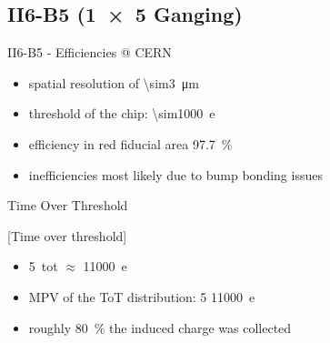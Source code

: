 \subsection{II6-B5 (\SI{1x5}{} Ganging)}
\begin{frame}{II6-B5 - Efficiencies @ CERN}

	
	\begin{itemize}\itemfill
		\item spatial resolution of \SI{\sim3}{\micro\meter}
		\item threshold of the chip: \SI{\sim1000}{e}
		\item efficiency in red fiducial area \SI{97.7}{\%}
		\item inefficiencies most likely due to bump bonding issues
	\end{itemize}
	
\end{frame}
\begin{frame}{Time Over Threshold}

	[Time over threshold]	
	
	\begin{itemize}\itemfill
		\item \SI{5}{tot} $\approx$ \SI{11000}{e}
		\item MPV of the ToT distribution: 5 \ra \SI{11000}{e}
		\item roughly \SI{80}{\%} the induced charge was collected
	\end{itemize}
	
\end{frame}
